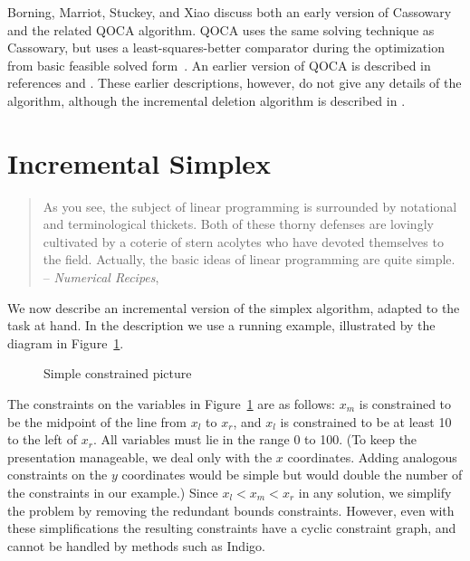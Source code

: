 \documentclass{article}
\begin{document}
Borning, Marriot, Stuckey, and Xiao discuss both an early version of
Cassowary and the related QOCA algorithm.  QOCA uses the same solving
technique as Cassowary, but uses a least-squares-better comparator
during the optimization from basic feasible solved
form~\cite{borning-uist-97,borning-simplex-tr}.  An earlier version of
QOCA is described in references \cite{helm-gi-92} and
\cite{helm-eurographics-92}.  These earlier descriptions, however, do
not give any details of the algorithm, although the incremental deletion
algorithm is described in \cite{huynh-marriott-96}.


\section{Incremental Simplex}
\label{inc-simplex}

\begin{quotation}
  As you see, the subject of linear programming is surrounded by
  notational and terminological thickets.  Both of these thorny defenses
  are lovingly cultivated by a coterie of stern acolytes who have
  devoted themselves to the field.  Actually, the basic ideas of linear
  programming are quite simple.  -- {\em Numerical Recipes}, \cite[page
  424]{press-89}
\end{quotation}

We now describe an incremental version of the simplex algorithm, adapted
to the task at hand.  In the description we use a running example,
illustrated by the diagram in Figure~\ref{fig:pict}.

\begin{figure}[htb]
\begin{center}

\end{center}
\caption{Simple constrained picture\label{fig:pict}}
\end{figure}

The constraints on the variables in Figure~\ref{fig:pict} are as follows:
$x_m$ is constrained to be the midpoint of the line from $x_l$ to $x_r$,
and $x_l$ is constrained to be at least 10 to the left of $x_r$.  All
variables must lie in the range 0 to 100.  (To keep the presentation
manageable, we deal only with the $x$ coordinates.  Adding analogous
constraints on the $y$ coordinates would be simple but would double the
number of the constraints in our example.)  Since $x_l < x_m < x_r$ in any
solution, we simplify the problem by removing the redundant bounds
constraints.  However,
even with these simplifications the resulting constraints have a cyclic
constraint graph, and cannot be handled by methods such as Indigo.
\end{document}
